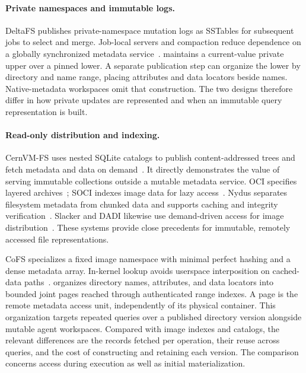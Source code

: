 \paragraph{Private namespaces and immutable logs.}
DeltaFS publishes private-namespace mutation logs as SSTables for
subsequent jobs to select and merge. Job-local servers and compaction
reduce dependence on a globally synchronized metadata
service~\cite{deltafs2021}. \sys maintains a current-value private upper
over a pinned lower. A separate publication step can organize the lower
by directory and name range, placing attributes and data locators beside
names. Native-metadata workspaces omit that construction. The two designs
therefore differ in how private updates are represented and when an
immutable query representation is built.

\paragraph{Read-only distribution and indexing.}
CernVM-FS uses nested SQLite catalogs to publish content-addressed trees
and fetch metadata and data on demand~\cite{cvmfs2011}. It directly
demonstrates the value of serving immutable collections outside a mutable
metadata service. OCI specifies layered archives~\cite{oci_layers};
SOCI indexes image data for lazy access~\cite{soci}. Nydus separates
filesystem metadata from chunked data and supports caching and integrity
verification~\cite{nydus_rafs}. Slacker and DADI likewise use
demand-driven access for image distribution~\cite{slacker2016,dadi2020}.
These systems provide close precedents for immutable, remotely accessed
file representations.

CoFS specializes a fixed image namespace with minimal perfect hashing
and a dense metadata array. In-kernel lookup avoids userspace
interposition on cached-data paths~\cite{cofs2026}. \sys organizes
directory names, attributes, and data locators into bounded joint pages
reached through authenticated range indexes. A page is the remote
metadata access unit, independently of its physical container. This
organization targets repeated queries over a published directory version
alongside mutable agent workspaces. Compared with image indexes and
catalogs, the relevant differences are the records fetched per operation,
their reuse across queries, and the cost of constructing and retaining
each version. The comparison concerns access during execution as well
as initial materialization.

